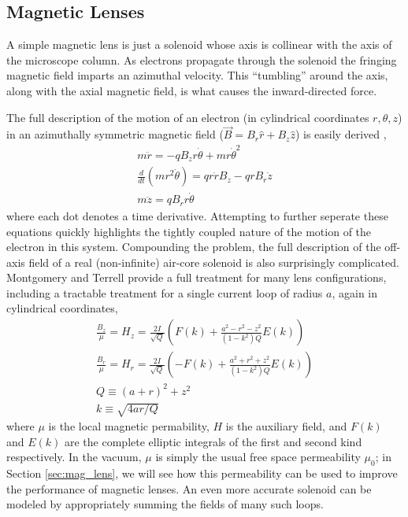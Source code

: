 \subsection{Magnetic Lenses} \label{sec:mag_lens_model}

A simple magnetic lens is just a solenoid whose axis is collinear with the axis of the microscope column.
As electrons propagate through the solenoid the fringing magnetic field imparts an azimuthal velocity.
This ``tumbling'' around the axis, along with the axial magnetic field, is what causes the inward-directed force. 

The full description of the motion of an electron (in cylindrical coordinates $r, \theta, z$) in an azimuthally symmetric magnetic field ($\vec{B} = B_r \hat{r} + B_z \hat{z}$) is easily derived \cite{el-kareh_electron_1970},
\begin{subequations} \label{eq:lens_eq_of_motion}
\begin{gather}
  m \ddot{r} = -q B_z r \dot{\theta} + m r \dot{\theta}^2                 \\
  \frac{d}{dt} ( m r^2 \dot{\theta} ) = q r \dot{r} B_z - q r B_r \dot{z} \\
  m \ddot{z} = q B_r r \dot{\theta}
\end{gather}
\end{subequations}
where each dot denotes a time derivative.
Attempting to further seperate these equations quickly highlights the tightly coupled nature of the motion of the electron in this system.
Compounding the problem, the full description of the off-axis field of a real (non-infinite) air-core solenoid is also surprisingly complicated.
Montgomery and Terrell \cite{montgomery_some_1961} provide a full treatment for many lens configurations, including a tractable treatment for a single current loop of radius $a$, again in cylindrical coordinates, 
\begin{subequations} \label{eq:field_of_loop}
\begin{gather}
  \frac{B_z}{\mu} = H_z = \frac{2I}{\sqrt{Q}} \left(   F(k) + \frac{ a^2 - r^2 - z^2 }{ (1-k^2) Q } E(k) \right) \\
  \frac{B_r}{\mu} = H_r = \frac{2I}{\sqrt{Q}} \left( - F(k) + \frac{ a^2 + r^2 + z^2 }{ (1-k^2) Q } E(k) \right) \\
  Q \equiv (a+r)^2 + z^2 \\
  k \equiv \sqrt{ 4 a r / Q }
\end{gather}
\end{subequations}
where $\mu$ is the local magnetic permability, $H$ is the auxiliary field, and $F(k)$ and $E(k)$ are the complete elliptic integrals of the first and second kind respectively.
In the vacuum, $\mu$ is simply the usual free space permeability $\mu_0$; in Section \ref{sec:mag_lens}, we will see how this permeability can be used to improve the performance of magnetic lenses.
An even more accurate solenoid can be modeled by appropriately summing the fields of many such loops.

